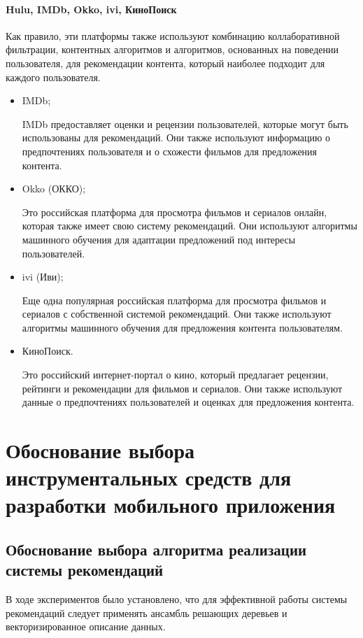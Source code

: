 \paragraph{Hulu, IMDb, Okko, ivi, КиноПоиск}

Как правило, эти платформы также используют комбинацию коллаборативной фильтрации, контентных алгоритмов и алгоритмов,
основанных на поведении пользователя, для рекомендации контента, который наиболее подходит для каждого пользователя.

\begin{itemize}
    \item IMDb; \par
    IMDb предоставляет оценки и рецензии пользователей, которые могут быть использованы для рекомендаций.
    Они также используют информацию о предпочтениях пользователя и о схожести фильмов для предложения контента.

    \item Okko (ОККО); \par
    Это российская платформа для просмотра фильмов и сериалов онлайн, которая также имеет свою систему рекомендаций.
    Они используют алгоритмы машинного обучения для адаптации предложений под интересы пользователей.

    \item ivi (Иви);\par
    Еще одна популярная российская платформа для просмотра фильмов и сериалов с собственной системой рекомендаций.
    Они также используют алгоритмы машинного обучения для предложения контента пользователям.

    \item КиноПоиск.\par
    Это российский интернет-портал о кино, который предлагает рецензии, рейтинги и рекомендации для фильмов и сериалов.
    Они также используют данные о предпочтениях пользователей и оценках для предложения контента.
\end{itemize}
\clearpage

\section{Обоснование выбора инструментальных средств для разработки мобильного приложения}

\subsection{Обоснование выбора алгоритма реализации системы рекомендаций}
В ходе экспериментов было установлено, что для эффективной работы системы рекомендаций следует применять ансамбль
решающих деревьев и векторизированное описание данных.

